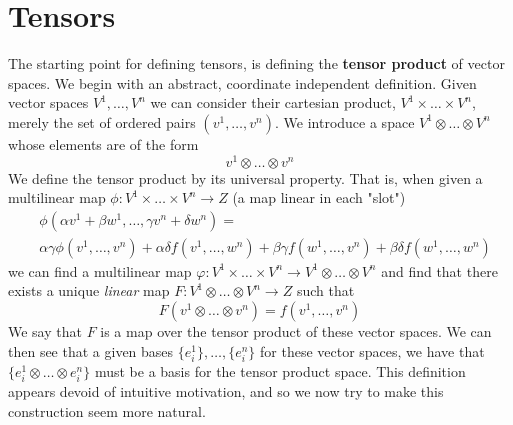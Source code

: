   \section*{Tensors}
  The starting point for defining tensors, is defining the \textbf{tensor product} of vector spaces.  We begin with an abstract, coordinate independent definition.  Given vector spaces $V^1, \dots, V^n$ we can consider their cartesian product, $V^1 \times \dots \times V^n$, merely the set of ordered pairs $(v^1, \dots, v^n)$.  We introduce a space $	V^1 \otimes \dots \otimes V^n$ whose elements are of the form 
  \begin{equation*}
  	v^1\otimes\dots \otimes v^n
  \end{equation*}
   We define the tensor product by its universal property.  That is, when given a multilinear map $\phi: V^1 \times \dots \times V^n \to Z$ (a map linear in each "slot")
   \begin{align*}
   	&\phi(\alpha v^1+\beta w^1, \dots, \gamma v^n +\delta w^n) =\\
   	 & \alpha \gamma \phi(v^1, \dots, v^n)+\alpha \delta f(v^1, \dots, w^n)+\beta \gamma f(w^1, \dots, v^n)+\beta\delta f(w^1, \dots, w^n)
   \end{align*}
   we can find a multilinear map $\varphi: V^1 \times \dots \times V^n \to V^1 \otimes \dots \otimes V^n$ and find that there exists a unique \textit{linear} map $F:V^1 \otimes \dots \otimes V^n \to Z$ such that 
   \begin{equation*}
   	F(v^1\otimes\dots \otimes v^n) = f(v^1, \dots, v^n)
   \end{equation*}
   We say that $F$ is a map over the tensor product of these vector spaces.  We can then see that a given bases $\{e^1_i\}, \dots, \{e_i^n\}$ for these vector spaces, we have that $\{e^1_i\otimes \dots \otimes e^n_i\}$ must be a basis for the tensor product space.  
   This definition appears devoid of intuitive motivation, and so we now try to make this construction seem more natural.  \\
   
